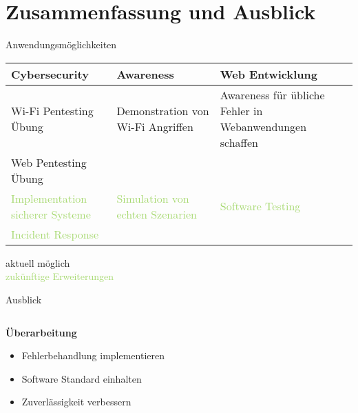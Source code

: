{\section{Zusammenfassung und Ausblick}

\begin{frame}
    \centering
    \tableofcontents[currentsection]
\end{frame}

\begin{frame}{Anwendungsmöglichkeiten}
\small %
\vspace{1cm}
\begin{table}[h]
\centering
\renewcommand{\arraystretch}{1.5}
\begin{tabular}{@{}p{}p{}p{}@{}}
    \textbf{Cybersecurity} & \textbf{Awareness} & \textbf{Web Entwicklung} \\
    \hline
    Wi-Fi Pentesting Übung & Demonstration von Wi-Fi Angriffen & Awareness für übliche Fehler in Webanwendungen schaffen\\
    Web Pentesting Übung \\
    \textcolor[HTML]{A5D86E}{Implementation sicherer Systeme} & \textcolor[HTML]{a5d86e}{Simulation von echten Szenarien} & \textcolor[HTML]{a5d86e}{Software Testing} \\
    \textcolor[HTML]{A5D86E}{Incident Response} & ~ & ~ \\
\end{tabular}
\end{table}
\vspace{0.6cm}
\tiny
\centering
aktuell möglich
\\\textcolor[HTML]{A5D86E}{zukünftige Erweiterungen}

\end{frame}

\begin{frame}{Ausblick}
   \centering
   \begin{columns}
   \begin{column}{0.5\textwidth}
        \textbf{Überarbeitung}
        \begin{itemize}
            \item Fehlerbehandlung implementieren
            \item Software Standard einhalten
            \item Zuverlässigkeit verbessern
        \end{itemize}\pause
   \end{column} 


\end{columns}
\end{frame}}
